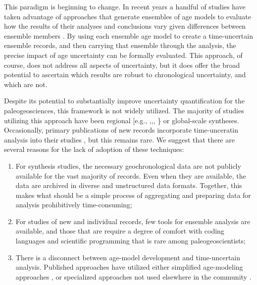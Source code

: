 \documentclass[gc, manuscript]{copernicus}
\begin{document}
This paradigm is beginning to change. In recent years a handful of
studies have taken advantage of approaches that generate ensembles of
age models to evaluate how the results of their analyses and conclusions
vary given differences between ensemble members
\citep[\citet{Rhines_JGR2011},\citet{Anchukaitis_Tierney2012},\citet{Shakun_Nature2012},\citet{Marcott_Science2013},
\citet{Tierney2013}]{Haam_Huybers2010}. By using each ensemble age model
to create a time-uncertain ensemble records, and then carrying that
ensemble through the analysis, the precise impact of age uncertainty can
be formally evaluated. This approach, of course, does not address all
aspects of uncertainty, but it does offer the broad potential to
ascertain which results are robust to chronological uncertainty, and
which are not.

Despite its potential to substantially improve uncertainty
quantification for the paleogeosciences, this framework is not widely
utilized. The majority of studies utilizing this approach have been
regional {[}e.g.,
\citet{Anchukaitis_Tierney2012},\citet{Tierney2013},\citet{mckay_onset_2018},
\citet{routson2018}\} or global-scale
\citep[e.g.,][\citet{Marcott_Science2013},\citet{kaufman2020HoloceneGMST}]{Shakun_Nature2012}
syntheses. Occasionally, primary publications of new records incorporate
time-unceratin analysis into their studies \citep[more]{Boldt2015}, but
this remains rare. We suggest that there are several reasons for the
lack of adoption of these techniques:

\begin{enumerate}
\def\labelenumi{\arabic{enumi}.}
\item
  For synthesis studies, the necessary geochronological data are not
  publicly available for the vast majority of records. Even when they
  are available, the data are archived in diverse and unstructured data
  formats. Together, this makes what should be a simple process of
  aggregating and preparing data for analysis prohibitively
  time-consuming;
\item
  For studies of new and individual records, few tools for ensemble
  analysis are available, and those that are require a degree of comfort
  with coding languages and scientific programming that is rare among
  paleogeoscientists;
\item
  There is a disconnect between age-model development and time-uncertain
  analysis. Published approaches have utilized either simplified
  age-modeling approaches \citep{Haam_Huybers2010}, or specialized
  approaches not used elsewhere in the community
  \citep[\citet{Anchukaitis_Tierney2012},\citet{Marcott_Science2013},\citet{Tierney2013},\citet{routson2018}]{Shakun_Nature2012}.
\end{enumerate}
\end{document}
